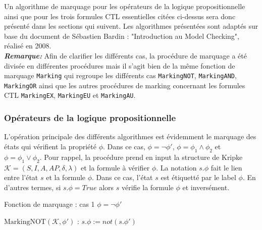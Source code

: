 \documentclass[runningheads,a4paper,10pt]{llncs}
\newcommand{\var}[1]{\mathit{#1}}
\newcommand{\func}[1]{\mathrm{#1}}
\begin{document}
Un algorithme de marquage pour les opérateurs de la logique propositionnelle ainsi que pour les trois formules CTL essentielles citées ci-dessus sera donc présenté dans les sections qui suivent. Les algorithmes présentées sont adaptés sur base du document de Sébastien Bardin : "Introduction au Model Checking", réalisé en 2008. \cite{Bardin-MC} \\  

\danger
\textbf{\textit{Remarque:}} Afin de clarifier les différents cas, la procédure de marquage a été divisée en différentes procédures mais il s'agit bien de la même fonction de marquage \texttt{Marking} qui regroupe les différents cas \texttt{MarkingNOT}, \texttt{MarkingAND}, \texttt{MarkingOR} ainsi que les autres procédures de marking concernant les formules CTL \texttt{MarkingEX}, \texttt{MarkingEU} et \texttt{MarkingAU}.

\subsubsection{Opérateurs de la logique propositionnelle} 

L'opération principale des différents algorithmes est évidemment le marquage des états qui vérifient la propriété $\phi$. Dans ce cas, $\phi = \neg \phi '$, $\phi = \phi_{1} \wedge \phi_{2}$ et $\phi = \phi_{1} \vee \phi_{2}$. Pour rappel, la procédure prend en input la structure de Kripke $\mathcal{K} = (S,I,A,AP,\delta,\lambda)$ et la formule à vérifier $\phi$. La notation $s.\phi$ fait le lien entre l'état $s$ et la formule $\phi$. Dans ce cas, l'état $s$ est étiquetté par le label $\phi$. En d'autres termes, si $s.\phi = True$ alors $s$ vérifie la formule $\phi$ et inversément.   

\begin{algorithm}
  \caption{Fonction de marquage : cas 1 $\phi = \neg\phi '$}\label{euclid}
  \begin{algorithmic}[1]
  \State $\func{MarkingNOT}(\mathcal{K}, \phi ')$
  \ForAll{$\var{s}$ in $\var{S}$}:
  \State $s.\phi := not(s.\phi ')$
  \EndFor
  \EndProcedure
  \end{algorithmic}
\end{algorithm}
\end{document}
